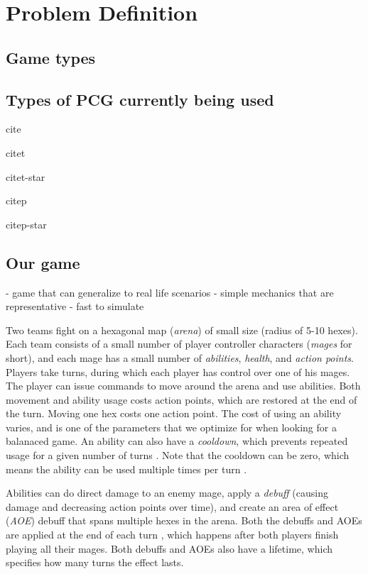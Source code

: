 \chapter{Problem Definition}

\section{Game types}

\section{Types of PCG currently being used}

cite \cite{Genberget08}

citet \citet{Genberget08}

citet-star \citet*{Genberget08}

citep \citep{Genberget08}

citep-star \citep*{Genberget08}


\section{Our game}

- game that can generalize to real life scenarios
- simple mechanics that are representative
- fast to simulate

Two teams fight on a hexagonal map (\emph{arena}) of small size (radius of
5-10 hexes). Each team consists of a small number of player controller
characters (\emph{mages} for short), and each mage has a small number of
\emph{abilities}, \emph{health}, and \emph{action points}. Players take turns, during
which each player has control over one of his mages. The player can issue
commands to move around the arena and use abilities. Both movement and ability
usage costs action points, which are restored at the end of the turn.  Moving
one hex costs one action point. The cost of using an ability varies, and is one
of the parameters that we optimize for when looking for a balanaced game. An
ability can also have a \emph{cooldown}, which prevents repeated usage for a
given number of turns . Note that the cooldown can
be zero, which means the ability can be used multiple times per turn
.


Abilities can do direct damage to an enemy mage, apply a \emph{debuff} (causing
damage and decreasing action points over time), and create an area of effect
(\emph{AOE}) debuff that spans multiple hexes in the arena. Both the debuffs and
AOEs are applied at the end of each turn , which happens after both players finish playing all their mages.
Both debuffs and AOEs also have a lifetime, which specifies how many turns
 the effect lasts.
